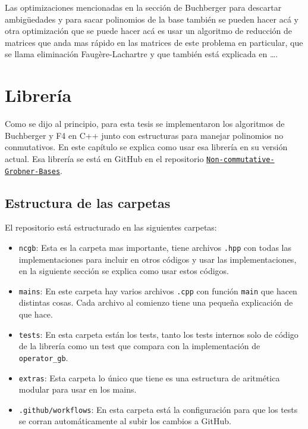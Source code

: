 \documentclass{report}
\theoremstyle{customstyle}
\theoremstyle{factstyle}
\begin{document}
Las optimizaciones mencionadas en la sección de Buchberger para descartar ambigüedades y para sacar polinomios de la base también se pueden hacer acá y otra optimización que se puede hacer acá es usar un algoritmo de reducción de matrices que anda mas rápido en las matrices de este problema en particular,  que se llama eliminación Faugère-Lachartre y que también está explicada en …. %

\chapter{Librería}

Como se dijo al principio, para esta tesis se implementaron los algoritmos de Buchberger y F4 en C++ junto con estructuras para manejar polinomios no conmutativos. En este capítulo se explica como usar esa librería en su versión actual. %
Esa librería se está en GitHub en el repositorio \href{https://github.com/IvanRenison/Non-commutative-Grobner-Bases}{\texttt{Non-commutative-Grobner-Bases}}. %

\section{Estructura de las carpetas}

El repositorio está estructurado en las siguientes carpetas:

\begin{itemize}
  \item \texttt{ncgb}: Esta es la carpeta mas importante, tiene archivos \texttt{.hpp} con todas las implementaciones para incluir en otros códigos y usar las implementaciones, en la siguiente sección se explica como usar estos códigos.
  \item \texttt{mains}: En este carpeta hay varios archivos \texttt{.cpp} con función \texttt{main} que hacen distintas cosas. Cada archivo al comienzo tiene una pequeña explicación de que hace.
  \item \texttt{tests}: En esta carpeta están los tests, tanto los tests internos solo de código de la librería como un test que compara con la implementación de \texttt{operator\_gb}. %
  \item \texttt{extras}: Esta carpeta lo único que tiene es una estructura de aritmética modular para usar en los mains.
  \item \texttt{.github/workflows}: En esta carpeta está la configuración para que los tests se corran automáticamente al subir los cambios a GitHub.
\end{itemize}
\end{document}
